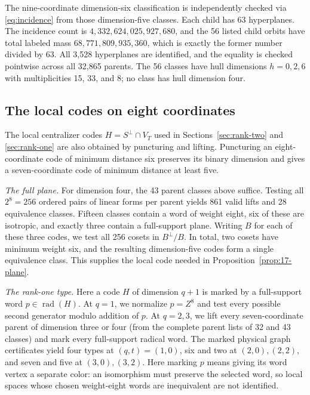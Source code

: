 \documentclass[11pt]{article}
\theoremstyle{definition}
\theoremstyle{remark}
\newcommand{\rad}{\operatorname{rad}}
\begin{document}
The nine-coordinate dimension-six classification is independently
checked via \eqref{eq:incidence} from those dimension-five classes. Each
child has 63 hyperplanes. The incidence count is
\(4{,}332{,}624{,}025{,}927{,}680\), and the 56 listed child orbits have
total labeled mass \(68{,}771{,}809{,}935{,}360\), which is exactly the
former number divided by 63. All 3,528 hyperplanes are identified, and
the equality is checked pointwise across all 32,865 parents. The 56
classes have hull dimensions \(h=0,2,6\) with multiplicities 15, 33, and
8; no class has hull dimension four.

\subsection{The local codes on eight coordinates}\label{sec:local-classifications}

The local centralizer codes \(H=S^\perp\cap V_T\) used in
Sections~\ref{sec:rank-two} and \ref{sec:rank-one} are also obtained by
puncturing and lifting. Puncturing an eight-coordinate code of minimum
distance six preserves its binary dimension and gives a seven-coordinate
code of minimum distance at least five.

\emph{The full plane.} For dimension four, the 43 parent classes above
suffice. Testing all \(2^8=256\) ordered pairs of linear forms per
parent yields 861 valid lifts and 28 equivalence classes. Fifteen
classes contain a word of weight eight, six of these are isotropic, and
exactly three contain a full-support plane. Writing \(B\) for each of
these three codes, we test all 256 cosets in \(B^\perp/B\). In total,
two cosets have minimum weight six, and the resulting dimension-five
codes form a single equivalence class. This supplies the local code
needed in Proposition~\ref{prop:17-plane}.

\emph{The rank-one type.} Here a code \(H\) of dimension \(q+1\) is
marked by a full-support word \(p\in\rad(H)\). At \(q=1\), we normalize
\(p=Z^8\) and test every possible second generator modulo addition of
\(p\). At \(q=2,3\), we lift every seven-coordinate parent of dimension
three or four (from the complete parent lists of 32 and 43 classes) and
mark every full-support radical word. The marked physical graph
certificates yield four types at \((q,t)=(1,0)\), six and two at
\((2,0),(2,2)\), and seven and five at \((3,0),(3,2)\). Here marking
\(p\) means giving its word vertex a separate color: an isomorphism must
preserve the selected word, so local spaces whose chosen weight-eight
words are inequivalent are not identified.
\end{document}
